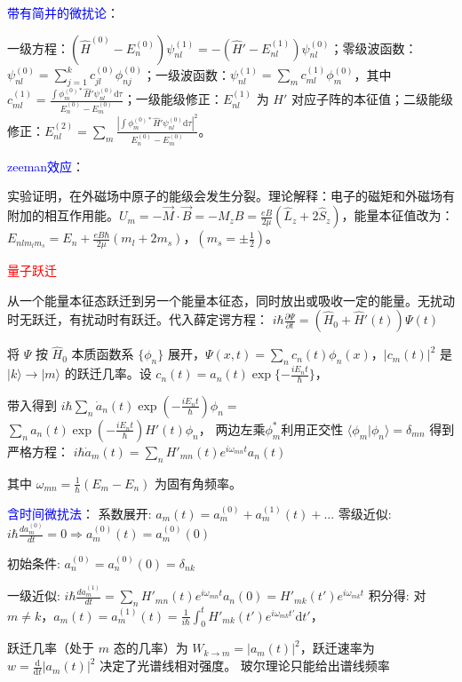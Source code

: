 \documentclass[a4paper,8pt]{extarticle} %
\newcommand{\bluetext}[1]{\textcolor{blue}{#1}}
\newcommand{\redtext}[1]{\textcolor{red}{#1}}
\begin{document}
\begin{multicols}{3}
\bluetext{带有简并的微扰论}：

一级方程：$(\hat{H}^{(0)} - E_n^{(0)})\psi_{nl}^{(1)} = -(\hat{H}' - E_{nl}^{(1)})\psi_{nl}^{(0)}$；零级波函数：$\psi_{nl}^{(0)} = \sum_{j=1}^k c_{jl}^{(0)} \phi_{nj}^{(0)}$；一级波函数：$\psi_{nl}^{(1)} = \sum_m c_{ml}^{(1)}\phi_m^{(0)}$，其中 $c_{ml}^{(1)} = \frac{\int \phi_m^{(0)*} \hat{H}' \psi_{nl}^{(0)} \mathrm{d}\tau}{E_n^{(0)}-E_m^{(0)}}$；一级能级修正：$E_{nl}^{(1)}$ 为 $H'$ 对应子阵的本征值；二级能级修正：$E_{nl}^{(2)} = \sum_m \frac{|\int \phi_m^{(0)*} \hat{H}' \psi_{nl}^{(0)} \mathrm{d}\tau|^2}{E_n^{(0)}-E_m^{(0)}}$。

\bluetext{zeeman效应}：

实验证明，在外磁场中原子的能级会发生分裂。理论解释：电子的磁矩和外磁场有附加的相互作用能。$U_m = -\vec{M}\cdot\vec{B} = -M_z B = \frac{eB}{2\mu}(\hat{L}_z + 2\hat{S}_z)$，能量本征值改为：$E_{nlm_l m_s} = E_n + \frac{eB\hbar}{2\mu}(m_l + 2m_s)$，$(m_s = \pm\frac{1}{2})$。

\redtext{量子跃迁}

从一个能量本征态跃迁到另一个能量本征态，同时放出或吸收一定的能量。无扰动时无跃迁，有扰动时有跃迁。代入薛定谔方程：
$i\hbar\frac{\partial\Psi}{\partial t} = (\hat{H}_0 + \hat{H}'(t))\Psi(t)$

将 $\Psi$ 按 $\hat{H}_0$ 本质函数系 $\{\phi_n\}$ 展开，$\Psi(x,t) = \sum_n c_n(t)\phi_n(x)$，$|c_m(t)|^2$ 是 $|k\rangle \to |m\rangle$ 的跃迁几率。设 $c_n(t) = a_n(t)\exp\{-\frac{iE_n t}{\hbar}\}$，

带入得到
$i\hbar\sum_n \dot{a}_n(t)\exp(-\frac{iE_nt}{\hbar})\phi_n =$\\$ \sum_n a_n(t)\exp(-\frac{iE_nt}{\hbar})\hat{H}'(t)\phi_n$，
两边左乘$\phi_m^*$利用正交性 $\langle\phi_m|\phi_n\rangle = \delta_{mn}$ 得到严格方程：
$i\hbar\dot{a}_m(t) = \sum_n H'_{mn}(t)e^{i\omega_{mn}t}a_n(t)$

其中 $\omega_{mn} = \frac{1}{\hbar}(E_m - E_n)$ 为固有角频率。

\bluetext{含时间微扰法}：
系数展开:
$a_m(t) = a_m^{(0)} + a_m^{(1)}(t) + ...$
零级近似:
$i\hbar\frac{da_m^{(0)}}{dt} = 0 \Rightarrow a_m^{(0)}(t) = a_m^{(0)}(0)$

初始条件: $a_n^{(0)} = a_n^{(0)}(0) = \delta_{nk}$

一级近似:
$i\hbar\frac{da_m^{(1)}}{dt} = \sum_n H'_{mn}(t)e^{i\omega_{mn}t}a_n(0) = H'_{mk}(t')e^{i\omega_{mk}t}$
积分得:
对 $m \neq k$，$a_m(t) = a_m^{(1)}(t) = \frac{1}{i\hbar}\int_0^t H'_{mk}(t')e^{i\omega_{mk}t'} \mathrm{d}t'$，

跃迁几率（处于 $m$ 态的几率）为 $W_{k\to m} = |a_m(t)|^2$，跃迁速率为 $w = \frac{\mathrm{d}}{{\mathrm{d}t}}|a_m(t)|^2$ 决定了光谱线相对强度。
玻尔理论只能给出谱线频率


\end{multicols}
\end{document}
